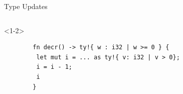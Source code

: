 \documentclass{sdqbeamer}
\begin{document}
\begin{frame}[fragile]{Type Updates}
  \begin{columns}
    \begin{onlyenv}<1-2>
      \begin{verbatim}
        fn decr() -> ty!{ w : i32 | w >= 0 } {
         let mut i = ... as ty!{ v: i32 | v > 0};
         i = i - 1;
         i
        }
      \end{verbatim}
    \end{onlyenv}


\end{columns}
\end{frame}
\end{document}

